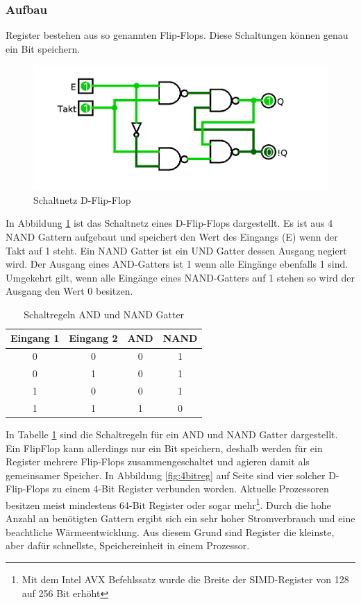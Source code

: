 \documentclass[12pt]{article}
\begin{document}
\subsubsection{Aufbau}
Register bestehen aus so genannten Flip-Flops. Diese Schaltungen können genau ein Bit speichern. 

\begin{figure}[!htb]
\centering
\includegraphics[scale=0.30]{flipflop}
\caption{Schaltnetz D-Flip-Flop}
\centering
\label{fig:flipflop}
\end{figure}

\noindent In Abbildung \ref{fig:flipflop} ist das Schaltnetz eines D-Flip-Flops dargestellt. Es ist aus 4 NAND Gattern aufgebaut und speichert den Wert des Eingangs (E) wenn der Takt auf 1 steht. Ein NAND Gatter ist ein UND Gatter dessen Ausgang negiert wird. Der Ausgang eines AND-Gatters ist 1 wenn alle Eingänge ebenfalls 1 sind. Umgekehrt gilt, wenn alle Eingänge eines NAND-Gatters auf 1 stehen so wird der Ausgang den Wert 0 besitzen.\cite[S.12-14]{elements2005}

\begin{table}[!htb]
\centering
\begin{tabular}{|c|c|c|c|}
\hline
Eingang 1 & Eingang 2 & AND & NAND \\ \hline
0         & 0         & 0   & 1    \\ \hline
0         & 1         & 0   & 1    \\ \hline
1         & 0         & 0   & 1    \\ \hline
1         & 1         & 1   & 0    \\ \hline
\end{tabular}
\caption{Schaltregeln AND und NAND Gatter}
\label{andnand}
\end{table}

\noindent In Tabelle \ref{andnand} sind die Schaltregeln für ein AND und NAND Gatter dargestellt. Ein FlipFlop kann allerdings nur ein Bit speichern, deshalb werden für ein Register mehrere Flip-Flops zusammengeschaltet und agieren damit als gemeinsamer Speicher. In Abbildung \ref{fig:4bitreg} auf Seite \pageref{page:4bitreg} sind vier solcher D-Flip-Flops zu einem 4-Bit Register verbunden worden.  Aktuelle Prozessoren besitzen meist mindestens 64-Bit Register oder sogar mehr\footnote{Mit dem Intel AVX Befehlssatz wurde die Breite der SIMD-Register von 128 auf 256 Bit erhöht\cite{lomont2011introduction}}. Durch die hohe Anzahl an benötigten Gattern ergibt sich ein sehr hoher Stromverbrauch und eine beachtliche Wärmeentwicklung. Aus diesem Grund sind Register die kleinste, aber dafür schnellste, Speichereinheit in einem Prozessor.
\end{document}
